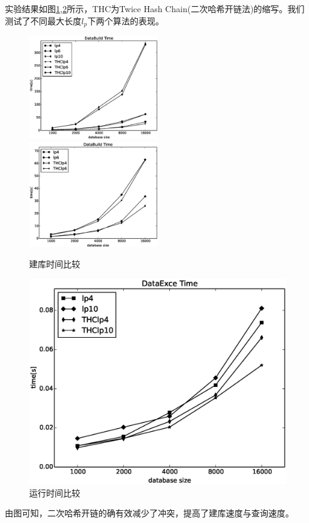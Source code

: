 \documentclass{XDBAthesis}
\numberwithin{algorithm}{chapter}
\begin{document}
实验结果如图\ref{fg:THCBuild},\ref{fg:THCRun}所示，THC为Twice Hash Chain(二次哈希开链法)的缩写。我们测试了不同最大长度$l_p $下两个算法的表现。
\begin{figure}[htb]
    \centering
    \includegraphics[width=0.5\textwidth]{../figures/THC/BuildCompare_4_6_10}%
    \includegraphics[width=0.5\textwidth]{../figures/THC/BuildCompare_4_6}
    \caption{建库时间比较}
    \label{fg:THCBuild}
\end{figure}
\begin{figure}[htb]
    \centering
    \includegraphics[width=\textwidth]{../figures/THC/ExceCompare_4_10}
    \caption{运行时间比较}
    \label{fg:THCRun}
\end{figure}

由图可知，二次哈希开链的确有效减少了冲突，提高了建库速度与查询速度。

\ifx\allfiles\undefined


\end{document}
